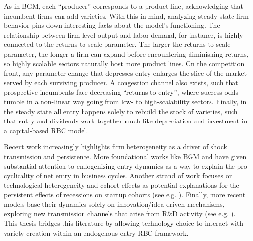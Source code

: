 \documentclass[a4paper,12pt]{article} %
\numberwithin{equation}{section} %
\numberwithin{figure}{section}
\numberwithin{table}{section}
\begin{document}
As in BGM, each ``producer'' corresponds to a product line, acknowledging that incumbent firms can add varieties. With this in mind, analyzing steady-state 
firm behavior pins down interesting facts about the model's functioning. 
The relationship between firm-level output and labor demand, for instance, is highly connected to the returns-to-scale parameter. The larger the returns-to-scale 
parameter, the longer a firm can expand before encountering diminishing returns, so highly scalable sectors naturally host more product lines. On the 
competition front, any parameter change that depresses entry enlarges the slice of the market served by each surviving producer. A congestion channel also
exists, such that prospective incumbents face decreasing ``returns-to-entry'', where success odds tumble in a non-linear way going from low- to high-scalability sectors.
Finally, in the steady state all entry happens solely to rebuild the stock of varieties, such that entry and dividends work together much like depreciation and
investment in a capital-based RBC model.


Recent work increasingly highlights firm heterogeneity as a driver of shock transmission and persistence. More foundational works 
like BGM and \textcite{ghironi2007trade} have given substantial attention to endogenizing entry dynamics as a way to explain the pro-cyclicality of net entry in 
business cycles.
Another strand of work focuses on technological heterogeneity and cohort effects as potential explanations for the persistent effects of recessions on startup cohorts
(see e.g. \cite{sedlavcek2017growth,clementi2016entry}). Finally, more recent models base their dynamics solely on innovation/idea-driven mechanisms, exploring
new transmission channels that arise from R\&D activity (see e.g. \cite{anzoategui2019endogenous,comin2006medium}). This thesis bridges this literature by 
allowing technology choice to interact with variety creation within an endogenous-entry RBC framework.
\end{document}
